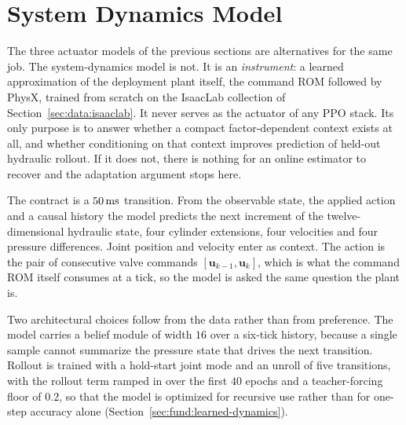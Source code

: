 \section{System Dynamics Model}
\label{sec:models:sd}
%
The three actuator models of the previous sections are alternatives for the
same job. The system-dynamics model is not. It is an \emph{instrument}: a
learned approximation of the deployment plant itself, the command ROM followed
by PhysX, trained from scratch on the IsaacLab collection of
Section~\ref{sec:data:isaaclab}. It never serves as the actuator of any PPO
stack. Its only purpose is to answer whether a compact factor-dependent
context exists at all, and whether conditioning on that context improves
prediction of held-out hydraulic rollout. If it does not, there is nothing for
an online estimator to recover and the adaptation argument stops here.

The contract is a $\unit[50]{ms}$ transition. From the observable state, the
applied action and a causal history the model predicts the next increment of
the twelve-dimensional hydraulic state, four cylinder extensions, four
velocities and four pressure differences. Joint position and velocity enter as
context. The action is the pair of consecutive valve commands
$[\bm{u}_{k-1}, \bm{u}_k]$, which is what the command ROM itself consumes at a
tick, so the model is asked the same question the plant is.

Two architectural choices follow from the data rather than from preference.
The model carries a belief module of width $16$ over a six-tick history,
because a single sample cannot summarize the pressure state that drives the
next transition. Rollout is trained with a hold-start joint mode and an unroll
of five transitions, with the rollout term ramped in over the first $40$
epochs and a teacher-forcing floor of $0.2$, so that the model is optimized for
recursive use rather than for one-step accuracy alone
(Section~\ref{sec:fund:learned-dynamics}).

